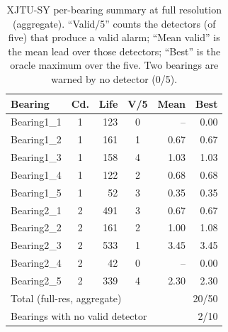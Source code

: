 \documentclass[IJPHM, 2026, 0]{PHMSociety}
\begin{document}
\begin{table}[t] \small
	\begin{center}
	\caption{XJTU-SY per-bearing summary at full resolution (aggregate). ``Valid/5'' counts the detectors (of five) that produce a valid alarm; ``Mean valid'' is the mean lead over those detectors; ``Best'' is the oracle maximum over the five. Two bearings are warned by no detector (0/5).}
	\label{tab:perbearing}
	\begin{tabular}{l c r c r r}
		\hline \hline
		\textbf{Bearing} & \textbf{Cd.} & \textbf{Life} & \textbf{V/5} & \textbf{Mean} & \textbf{Best} \\
		\hline
		Bearing1\_1 & 1 & 123 & 0 & -- & 0.00 \\
		Bearing1\_2 & 1 & 161 & 1 & 0.67 & 0.67 \\
		Bearing1\_3 & 1 & 158 & 4 & 1.03 & 1.03 \\
		Bearing1\_4 & 1 & 122 & 2 & 0.68 & 0.68 \\
		Bearing1\_5 & 1 & 52 & 3 & 0.35 & 0.35 \\
		Bearing2\_1 & 2 & 491 & 3 & 0.67 & 0.67 \\
		Bearing2\_2 & 2 & 161 & 2 & 1.00 & 1.08 \\
		Bearing2\_3 & 2 & 533 & 1 & 3.45 & 3.45 \\
		Bearing2\_4 & 2 & 42 & 0 & -- & 0.00 \\
		Bearing2\_5 & 2 & 339 & 4 & 2.30 & 2.30 \\
		\hline
		\multicolumn{4}{l}{Total (full-res, aggregate)} & \multicolumn{2}{r}{20/50} \\
		\multicolumn{4}{l}{Bearings with no valid detector} & \multicolumn{2}{r}{2/10} \\
		\hline \hline
	\end{tabular}
	\end{center}
\end{table}
\end{document}
